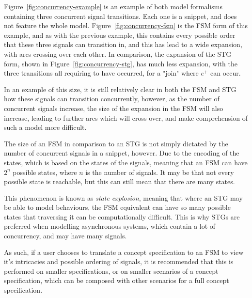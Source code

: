 Figure~\ref{fig:concurrency-example} is an example of both model formalisms containing three 
concurrent signal transitions. Each one is a snippet, and does not feature the whole model. 
Figure~\ref{fig:concurrency-fsm} is the FSM form of this example, and as with the previous example, 
this contains every possible order that these three signals can transition in, and this has lead to a wide 
expansion, with arcs crossing over each other. In comparison, the expansion of the STG form, shown in 
Figure~\ref{fig:concurrency-stg}, has much less expansion, with the three transitions all requiring to 
have occurred, for a "join" where $e^{+}$ can occur. 

In an example of this size, it is still relatively clear in both the FSM and STG how these signals can 
transition concurrently, however, as the number of concurrent signals increase, the size of the 
expansion in the FSM will also increase, leading to further arcs which will cross over, and make 
comprehension of such a model more difficult. 

The size of an FSM in comparison to an STG is not simply dictated by the number of concurrent signals 
in a snippet, however. Due to the encoding of the states, which is based on the states of the signals, 
meaning that an FSM can have $2^{n}$ possible states, where $n$ is the number of signals. It may be
that not every possible state is reachable, but this can still mean that there are many states. 

This phenomenon is known as \emph{state explosion}, meaning that where an STG may be able to 
model behaviours, the FSM equivalent can have so many possible states that traversing it can be 
computationally difficult. This is why STGs are preferred when modelling asynchronous systems, which 
contain a lot of concurrency, and may have many signals. 

As such, if a user chooses to translate a concept specification to an FSM to view it's intricacies and 
possible ordering of signals, it is recommended that this is performed on smaller specifications, or on 
smaller scenarios of a concept specification, which can be composed with other scenarios for a full 
concept specification.
 